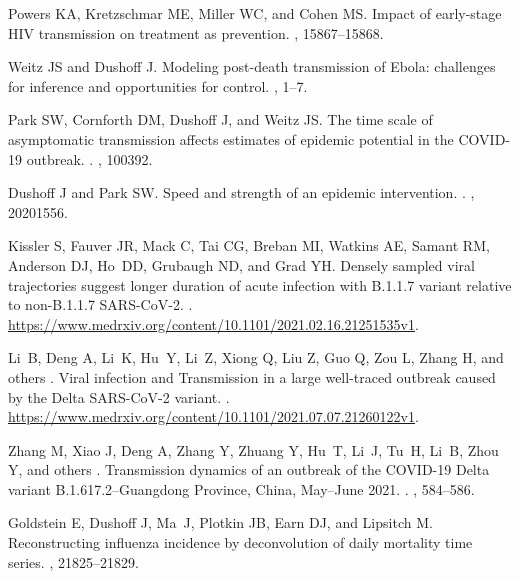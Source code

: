\documentclass[12pt]{article}
\begin{document}
\begin{thebibliography}{10}
Powers KA, Kretzschmar ME, Miller WC, and Cohen MS.
 Impact of early-stage {HIV} transmission on treatment as
  prevention.
, 15867--15868.

Weitz JS and Dushoff J.
 Modeling post-death transmission of {Ebola}: challenges for
  inference and opportunities for control.
, 1--7.

Park SW, Cornforth DM, Dushoff J, and Weitz JS.
 The time scale of asymptomatic transmission affects estimates of
  epidemic potential in the {COVID-19} outbreak.
.
, 100392.

Dushoff J and Park SW.
 Speed and strength of an epidemic intervention.
.
, 20201556.

Kissler S, Fauver JR, Mack C, Tai CG, Breban MI, Watkins AE, Samant RM,
  Anderson DJ, Ho~DD, Grubaugh ND, and Grad YH.
 {Densely sampled viral trajectories suggest longer duration of
  acute infection with B.1.1.7 variant relative to non-B.1.1.7 SARS-CoV-2}.
.
\newblock \url{https://www.medrxiv.org/content/10.1101/2021.02.16.21251535v1}.

Li~B, Deng A, Li~K, Hu~Y, Li~Z, Xiong Q, Liu Z, Guo Q, Zou L, Zhang H, and
  others .
 {Viral infection and Transmission in a large well-traced
  outbreak caused by the Delta SARS-CoV-2 variant}.
.
\newblock \url{https://www.medrxiv.org/content/10.1101/2021.07.07.21260122v1}.

Zhang M, Xiao J, Deng A, Zhang Y, Zhuang Y, Hu~T, Li~J, Tu~H, Li~B, Zhou Y, and
  others .
 Transmission dynamics of an outbreak of the {COVID-19} {Delta}
  variant {B.1.617.2}--{Guangdong Province, China, May--June 2021}.
.
, 584--586.

Goldstein E, Dushoff J, Ma~J, Plotkin JB, Earn DJ, and Lipsitch M.
 Reconstructing influenza incidence by deconvolution of daily
  mortality time series.
, 21825--21829.


\end{thebibliography}
\end{document}

